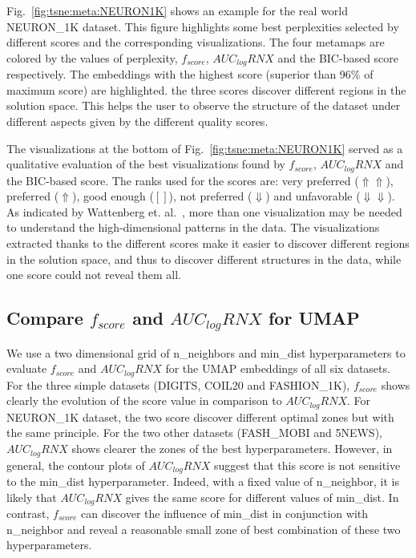 Fig.~\ref{fig:tsne:meta:NEURON1K} shows an example for the real world {NEURON\_1K} dataset.
This figure highlights some best perplexities selected by different scores and the corresponding visualizations.
The four metamaps are colored by the values of perplexity, $f_{score}$, $AUC_{log}RNX$ and the BIC-based score respectively.
The embeddings with the highest score (superior than 96\% of maximum score) are highlighted.
the three scores discover different regions in the solution space. This helps the user to observe the structure of the dataset under different aspects given by the different quality scores.

The visualizations at the bottom of Fig.~\ref{fig:tsne:meta:NEURON1K} served as a qualitative evaluation of the best visualizations found by $f_{score}$, $AUC_{log}RNX$ and the BIC-based score.
The ranks used for the scores are: very preferred ($\Uparrow\Uparrow$), preferred ($\Uparrow$), good enough ($[]$), not preferred ($\Downarrow$) and unfavorable ($\Downarrow\Downarrow$).
As indicated by Wattenberg et. al.~\cite{wattenberg2016use}, more than one visualization may be needed to understand the high-dimensional patterns in the data.
The visualizations extracted thanks to the different scores make it easier to discover different regions in the solution space, and thus to discover different structures in the data, while one score could not reveal them all.

\subsection{Compare $f_{score}$ and $AUC_{log}RNX$ for UMAP}\label{sec:compare:umap}

We use a two dimensional grid of {n\_neighbors} and {min\_dist} hyperparameters to evaluate $f_{score}$ and $AUC_{log}RNX$ for the UMAP embeddings of all six datasets.
For the three simple datasets (DIGITS, COIL20 and {FASHION\_1K}), $f_{score}$ shows clearly the evolution of the score value in comparison to $AUC_{log}RNX$.
For {NEURON\_1K} dataset, the two score discover different optimal zones but with the same principle.
For the two other datasets ({FASH\_MOBI} and 5NEWS), $AUC_{log}RNX$ shows clearer the zones of the best hyperparameters.
However, in general, the contour plots of $AUC_{log}RNX$ suggest that this score is not sensitive to the {min\_dist} hyperparameter.
Indeed, with a fixed value of {n\_neighbor}, it is likely that $AUC_{log}RNX$ gives the same score for different values of {min\_dist}.
In contrast, $f_{score}$ can discover the influence of {min\_dist} in conjunction with {n\_neighbor} and reveal a reasonable small zone of best combination of these two hyperparameters.

